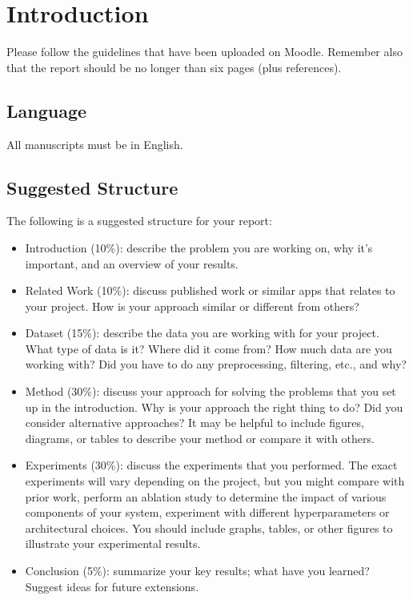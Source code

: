 \documentclass[10pt,twocolumn,letterpaper]{article}
\begin{document}
\section{Introduction}

Please follow the guidelines that have been uploaded on Moodle. 
Remember also that the report should be no longer than six pages (plus references).

\subsection{Language}

All manuscripts must be in English.

\subsection{Suggested Structure}

The following is a suggested structure for your report:

\begin{itemize}
	\item Introduction (10\%): describe the problem you are working on, why it's important, and an overview of your results.
	\item Related Work (10\%): discuss published work or similar apps that relates to your project. How is your approach similar or different from others?
	\item Dataset (15\%): describe the data you are working with for your project. What type of data is it? Where did it come from? How much data are you working with? Did you have to do any preprocessing, filtering, etc., and why?
	\item Method (30\%): discuss your approach for solving the problems that you set up in the introduction. Why is your approach the right thing to do? Did you consider alternative approaches? It may be helpful to include figures, diagrams, or tables to describe your method or compare it with others.
	\item Experiments (30\%): discuss the experiments that you performed. The exact experiments will vary depending on the project, but you might compare with prior work, perform an ablation study to determine the impact of various components of your system, experiment with different hyperparameters or architectural choices. You should include graphs, tables, or other figures to illustrate your experimental results.
	\item Conclusion (5\%): summarize your key results; what have you learned? Suggest ideas for future extensions.
\end{itemize}	
\end{document}
